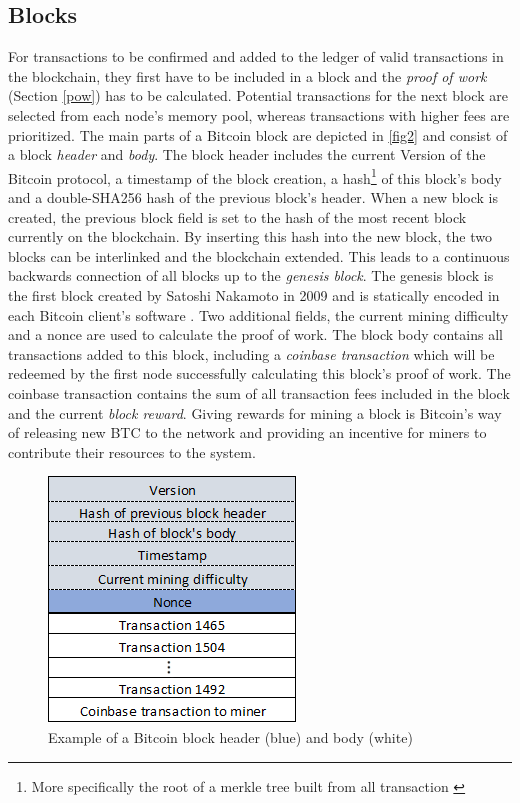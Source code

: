 \documentclass[a4paper,12pt,twoside]{report}
\begin{document}
\subsection{Blocks}
For transactions to be confirmed and added to the ledger of valid transactions in the blockchain, they first have to be included in a block and the \textit{proof of work} (Section \ref{pow}) has to be calculated. Potential transactions for the next block are selected from each node's memory pool, whereas transactions with higher fees are prioritized. The main parts of a Bitcoin block are depicted in \autoref{fig2} and consist of a block \textit{header} and \textit{body}. The block header includes the current Version of the Bitcoin protocol, a timestamp of the block creation, a hash\footnote{More specifically the root of a merkle tree built from all transaction \cite{okupski2014bitcoin}} of this block's body and a double-SHA256 hash of the previous block's header. When a new block is created, the previous block field is set to the hash of the most recent block currently on the blockchain. By inserting this hash into the new block, the two blocks can be interlinked and the blockchain extended. This leads to a continuous backwards connection of all blocks up to the \textit{genesis block}. The genesis block is the first block created by Satoshi Nakamoto in 2009 and is statically encoded in each Bitcoin client's software \cite{antonopoulos2017mastering}. Two additional fields, the current mining difficulty and a nonce are used to calculate the proof of work. The block body contains all transactions added to this block, including a \textit{coinbase transaction} which will be redeemed by the first node successfully calculating this block's proof of work. The coinbase transaction contains the sum of all transaction fees included in the block and the current \textit{block reward}. Giving rewards for mining a block is Bitcoin's way of releasing new BTC to the network and providing an incentive for miners to contribute their resources to the system. \cite{okupski2014bitcoin,antonopoulos2017mastering}
\begin{figure}[ht]
	\centering
  \includegraphics[scale=0.7]{BlockExample.png}
	\caption{Example of a Bitcoin block header (blue) and body (white) \cite{DSAwithTime,okupski2014bitcoin}}
	\label{fig2}
\end{figure}
\end{document}
